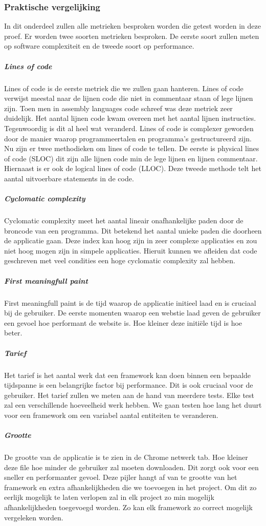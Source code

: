 \subsubsection{Praktische vergelijking}
\label{sec:Praktische_Vergelijking}
In dit onderdeel zullen alle metrieken besproken worden die getest worden in deze proef. Er worden twee soorten metrieken besproken. De eerste soort zullen meten op software complexiteit en de tweede soort op performance.

\subparagraph{Lines of code }
Lines of code is de eerste metriek die we zullen gaan hanteren. Lines of code verwijst meestal naar de lijnen code die niet in commentaar staan of lege lijnen zijn. Toen men in assembly languages code schreef was deze metriek zeer duidelijk. Het aantal lijnen code kwam overeen met het aantal lijnen instructies. Tegenwoordig is dit al heel wat veranderd. Lines of code is complexer geworden door de manier waarop programmeertalen en programma’s gestructureerd zijn. Nu zijn er twee methodieken om lines of code te tellen. De eerste is physical lines of code (SLOC) dit zijn alle lijnen code min de lege lijnen en lijnen commentaar. Hiernaast is er ook de logical lines of code (LLOC). Deze tweede methode telt het aantal uitvoerbare statements in de code.

\subparagraph{Cyclomatic complexity}
Cyclomatic complexity meet het aantal lineair onafhankelijke paden door de broncode van een programma. Dit betekend het aantal unieke paden die doorheen de applicatie gaan. Deze index kan hoog zijn in zeer complexe applicaties en zou niet hoog mogen zijn in simpele applicaties. Hieruit kunnen we afleiden dat code geschreven met veel condities een hoge cyclomatic complexity zal hebben.

\subparagraph{First meaningfull paint}
First meaningfull paint is de tijd waarop de applicatie initieel laad en is cruciaal bij de gebruiker. De eerste momenten waarop een webstie laad geven de gebruiker een gevoel hoe performant de website is. Hoe kleiner deze initiële tijd is hoe beter.

\subparagraph{Tarief}
Het tarief is het aantal werk dat een framework kan doen binnen een bepaalde tijdspanne is een belangrijke factor bij performance. Dit is ook cruciaal voor de gebruiker. Het tarief zullen we meten aan de hand van meerdere tests. Elke test zal een verschillende hoeveelheid werk hebben. We gaan testen hoe lang het duurt voor een framework om een variabel aantal entiteiten te veranderen.

\subparagraph{Grootte}
De grootte van de applicatie is te zien in de Chrome netwerk tab. Hoe kleiner deze file hoe minder de gebruiker zal moeten downloaden. Dit zorgt ook voor een sneller en performanter gevoel. Deze pijler hangt af van te grootte van het framework en extra afhankelijkheden die we toevoegen in het project. Om dit zo eerlijk mogelijk te laten verlopen zal in elk project zo min mogelijk afhankelijkheden toegevoegd worden. Zo kan elk framework zo correct mogelijk vergeleken worden.








